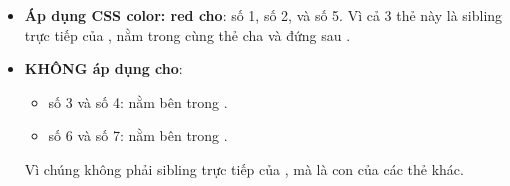 \begin{noteBox}
\begin{itemize}[leftmargin=1.5em, itemsep=3pt, parsep=0pt]
    \item \textcolor{tipBorder}{\textbf{Áp dụng CSS color: red cho}}:  số 1,  số 2, và  số 5. Vì cả 3 thẻ này là sibling trực tiếp của , nằm trong cùng thẻ cha  và đứng sau .
    \item \textcolor{warnBorder}{\textbf{KHÔNG áp dụng cho}}:
    \begin{itemize}[leftmargin=1.2em, itemsep=2pt, parsep=0pt]
        \item {} số 3 và số 4: nằm bên trong .
        \item {} số 6 và số 7: nằm bên trong .
    \end{itemize}
    Vì chúng không phải sibling trực tiếp của , mà là con của các thẻ  khác.
\end{itemize}
\end{noteBox}

